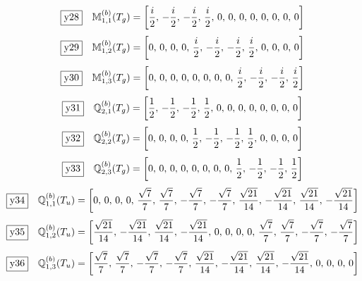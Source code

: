\documentclass[fleqn,10pt,landscape]{jsarticle}
\begin{document}
\begin{dmath*}
\fbox{y28}\quad \mathbb{M}_{1,1}^{(b)}(T_{g})=\left[ \frac{i}{2},\, - \frac{i}{2},\, - \frac{i}{2},\, \frac{i}{2},\, 0,\, 0,\, 0,\, 0,\, 0,\, 0,\, 0,\, 0 \right]
\end{dmath*}
\begin{dmath*}
\fbox{y29}\quad \mathbb{M}_{1,2}^{(b)}(T_{g})=\left[ 0,\, 0,\, 0,\, 0,\, \frac{i}{2},\, - \frac{i}{2},\, - \frac{i}{2},\, \frac{i}{2},\, 0,\, 0,\, 0,\, 0 \right]
\end{dmath*}
\begin{dmath*}
\fbox{y30}\quad \mathbb{M}_{1,3}^{(b)}(T_{g})=\left[ 0,\, 0,\, 0,\, 0,\, 0,\, 0,\, 0,\, 0,\, \frac{i}{2},\, - \frac{i}{2},\, - \frac{i}{2},\, \frac{i}{2} \right]
\end{dmath*}
\begin{dmath*}
\fbox{y31}\quad \mathbb{Q}_{2,1}^{(b)}(T_{g})=\left[ \frac{1}{2},\, - \frac{1}{2},\, - \frac{1}{2},\, \frac{1}{2},\, 0,\, 0,\, 0,\, 0,\, 0,\, 0,\, 0,\, 0 \right]
\end{dmath*}
\begin{dmath*}
\fbox{y32}\quad \mathbb{Q}_{2,2}^{(b)}(T_{g})=\left[ 0,\, 0,\, 0,\, 0,\, \frac{1}{2},\, - \frac{1}{2},\, - \frac{1}{2},\, \frac{1}{2},\, 0,\, 0,\, 0,\, 0 \right]
\end{dmath*}
\begin{dmath*}
\fbox{y33}\quad \mathbb{Q}_{2,3}^{(b)}(T_{g})=\left[ 0,\, 0,\, 0,\, 0,\, 0,\, 0,\, 0,\, 0,\, \frac{1}{2},\, - \frac{1}{2},\, - \frac{1}{2},\, \frac{1}{2} \right]
\end{dmath*}
\begin{dmath*}
\fbox{y34}\quad \mathbb{Q}_{1,1}^{(b)}(T_{u})=\left[ 0,\, 0,\, 0,\, 0,\, \frac{\sqrt{7}}{7},\, \frac{\sqrt{7}}{7},\, - \frac{\sqrt{7}}{7},\, - \frac{\sqrt{7}}{7},\, \frac{\sqrt{21}}{14},\, - \frac{\sqrt{21}}{14},\, \frac{\sqrt{21}}{14},\, - \frac{\sqrt{21}}{14} \right]
\end{dmath*}
\begin{dmath*}
\fbox{y35}\quad \mathbb{Q}_{1,2}^{(b)}(T_{u})=\left[ \frac{\sqrt{21}}{14},\, - \frac{\sqrt{21}}{14},\, \frac{\sqrt{21}}{14},\, - \frac{\sqrt{21}}{14},\, 0,\, 0,\, 0,\, 0,\, \frac{\sqrt{7}}{7},\, \frac{\sqrt{7}}{7},\, - \frac{\sqrt{7}}{7},\, - \frac{\sqrt{7}}{7} \right]
\end{dmath*}
\begin{dmath*}
\fbox{y36}\quad \mathbb{Q}_{1,3}^{(b)}(T_{u})=\left[ \frac{\sqrt{7}}{7},\, \frac{\sqrt{7}}{7},\, - \frac{\sqrt{7}}{7},\, - \frac{\sqrt{7}}{7},\, \frac{\sqrt{21}}{14},\, - \frac{\sqrt{21}}{14},\, \frac{\sqrt{21}}{14},\, - \frac{\sqrt{21}}{14},\, 0,\, 0,\, 0,\, 0 \right]
\end{dmath*}
\end{document}
